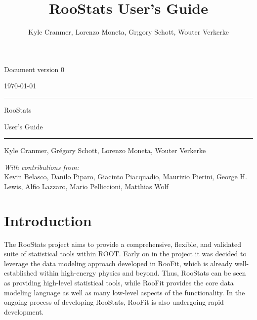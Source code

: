 \documentclass[11pt]{article}
\title{RooStats User's Guide}
\author{Kyle Cranmer, Lorenzo Moneta, Gr\eacute;gory Schott, Wouter Verkerke}
\begin{document}
\sf

{\flushright 
Document version 0 

\flushright 
\today

}

\vspace{2in}

\hrule
\vspace{.1in}
{\huge RooStats}
\vspace{.5in}

{\huge User's Guide}
\vspace{.1in}
\hrule

\vspace{.5in}

{\large Kyle Cranmer, Gr\'egory Schott, Lorenzo Moneta, Wouter Verkerke}

\vspace{2in}
{\em With contributions from:}\\

Kevin Belasco, Danilo Piparo, Giacinto Piacquadio, Maurizio Pierini, George H. Lewis, Alfio Lazzaro, Mario Pelliccioni, Matthias Wolf


\newpage
\tableofcontents 





\newpage
\section{Introduction}

The RooStats project aims to provide a comprehensive, flexible, and validated suite of statistical tools within ROOT.  Early on in the project it was decided to leverage the data modeling approach developed in RooFit, which is already well-established within high-energy physics and beyond.  Thus, RooStats can be seen as providing high-level statistical tools, while RooFit provides the core data modeling language as well as many low-level aspects of the functionality.   In the ongoing process of developing RooStats, RooFit is also undergoing rapid development.
\end{document}
